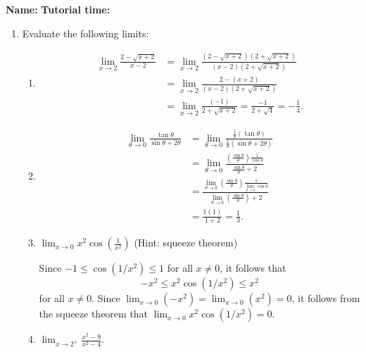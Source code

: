 \documentclass[12pt]{article}
\newcommand{\di}{\displaystyle}
\begin{document}
{\bf \large Name:} \hspace{2.5in} {\bf Tutorial time:}

\bigskip

\bigskip

\thispagestyle{fancy}

 \begin{enumerate}
 \item  Evaluate the following limits:
\begin{enumerate}
 \item \begin{align*} \lim_{x\to 2}\frac{2-\sqrt{x+2}}{x-2} & = \lim_{x\to 2}\frac{(2-\sqrt{x+2})(2+\sqrt{x+2})}{(x-2)(2+\sqrt{x+2})}\\
        & = \lim_{x\to 2}\frac{2-(x+2)}{(x-2)(2+\sqrt{x+2})}\\
        & = \lim_{x\to 2}\frac{(-1)}{2+\sqrt{x+2}} = \frac{-1}{2+\sqrt{4}} = -\frac{1}{4}.
       \end{align*}


 \item \begin{align*} \lim_{\theta\to 0}\frac{\tan\theta}{\sin\theta + 2\theta} & = \lim_{\theta\to 0}\frac{\frac{1}{\theta}(\tan\theta)}{\frac{1}{\theta}(\sin\theta+2\theta)}\\[4pt]
        & = \lim_{\theta\to 0}\frac{\left(\frac{\sin\theta}{\theta}\right)\frac{1}{\cos\theta}}{\frac{\sin\theta}{\theta}+2}\\[4pt]
	& = \frac{\lim_{\theta\to 0}\left(\frac{\sin\theta}{\theta}\right)\frac{1}{\lim_{\theta\to 0}\cos\theta}}{\lim_{\theta\to 0}\left(\frac{\sin\theta}{\theta}\right)+2}\\[4pt]
	& = \frac{1(1)}{1+2} = \frac{1}{3}.
       \end{align*}


 \item $\di \lim_{x\to 0}x^2\cos\left(\frac{1}{x^2}\right)$ (Hint: squeeze theorem)

\medskip

Since $-1\leq \cos(1/x^2)\leq 1$ for all $x\neq 0$, it follows that
\[
 -x^2\leq x^2\cos(1/x^2)\leq x^2
\]
for all $x\neq 0$. Since $\lim_{x\to 0}(-x^2) = \lim_{x\to 0}(x^2) =0$, it follows from the squeeze theorem that $\di \lim_{x\to 0}x^2\cos(1/x^2)=0$.

\bigskip

 \item $\di \lim_{x\to 2^+}\frac{x^2-9}{x^2-4}$.


\end{enumerate}
\end{enumerate}
\end{document}
